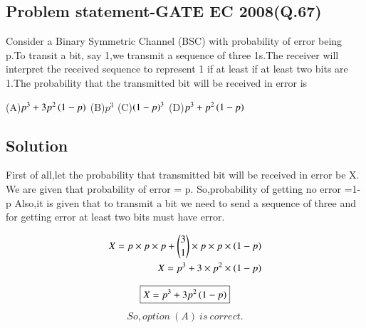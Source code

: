 \documentclass[journal,12pt,twocolumn]{IEEEtran}
\begin{document}
 \begin{center}
     \section{\textbf{Problem statement-GATE EC 2008(Q.67)}}
Consider a Binary Symmetric Channel (BSC) with probability of error being p.To transit a bit, say 1,we transmit a sequence of three 1s.The receiver will interpret the received sequence to represent 1 if at least if at least two bits are 1.The probability that the transmitted bit will be received in error is
 \end{center}
(A)$p^3 + 3 p^2\left(1-p\right)$ 
\newline
(B)$p^3$
\newline
(C)$\left(1-p\right)^3$
\newline
(D)$p^3+p^2\left(1-p\right)$
\begin{center}
    \section{\textbf{Solution}}
\end{center}

First of all,let the probability that transmitted bit will be received in error be X.
\newline
We are given that probability of error = p.  
\newline
So,probability of getting no error =1-p
\newline
Also,it is given that to transmit a bit we need to send a sequence of three and for getting error at least two bits must have error.

\begin{align}
    X =p \times p \times p + {3 \choose 1} \times p \times p \times \left(1-p\right)
    \\
    X = p^3+3 \times p^2 \times \left(1-p\right)
\end{align}

\begin{equation}
    \boxed{X=p^3+3p^2 \left(1-p\right)}
\end{equation}
\begin{align}
   So,option \ (A) \ is \ correct.
\end{align}
\end{document}
